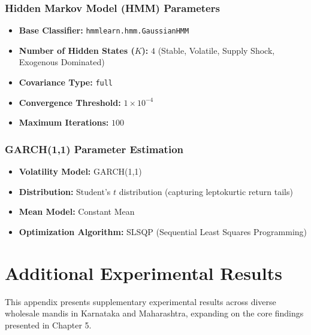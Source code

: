 \documentclass[12pt,a4paper]{report}
\theoremstyle{definition}
\theoremstyle{remark}
\begin{document}
\subsection{Hidden Markov Model (HMM) Parameters}
\begin{itemize}
    \item \textbf{Base Classifier:} \texttt{hmmlearn.hmm.GaussianHMM}
    \item \textbf{Number of Hidden States ($K$):} $4$ (Stable, Volatile, Supply Shock, Exogenous Dominated)
    \item \textbf{Covariance Type:} \texttt{full}
    \item \textbf{Convergence Threshold:} $1 \times 10^{-4}$
    \item \textbf{Maximum Iterations:} $100$
\end{itemize}

\subsection{GARCH(1,1) Parameter Estimation}
\begin{itemize}
    \item \textbf{Volatility Model:} GARCH(1,1)
    \item \textbf{Distribution:} Student's $t$ distribution (capturing leptokurtic return tails)
    \item \textbf{Mean Model:} Constant Mean
    \item \textbf{Optimization Algorithm:} SLSQP (Sequential Least Squares Programming)
\end{itemize}

\chapter{Additional Experimental Results}
\label{app:additional_results}

This appendix presents supplementary experimental results across diverse wholesale mandis in Karnataka and Maharashtra, expanding on the core findings presented in Chapter 5.
\end{document}
